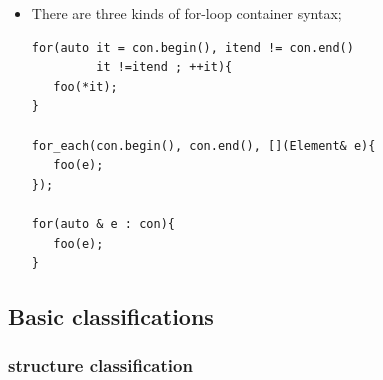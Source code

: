 \documentclass[a4paper,11pt,twoside]{book}
\begin{document}
\begin{itemize}
\item There are three kinds of for-loop container syntax;
\begin{lstlisting}[numbers=none]
for(auto it = con.begin(), itend != con.end()
         it !=itend ; ++it){
   foo(*it);
}

for_each(con.begin(), con.end(), [](Element& e){
   foo(e);
});

for(auto & e : con){
   foo(e);
}
\end{lstlisting}

\end{itemize}


\subsection{Basic classifications}
\subsubsection{structure classification}
\end{document}
